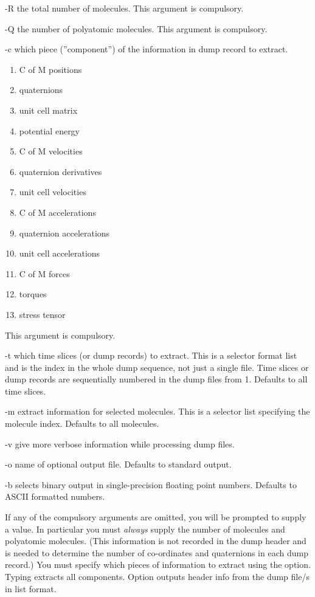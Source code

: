 \documentclass[a4paper,twoside]{report}
\begin{document}
\begin{Argdescription}
\item[-R] the total number of molecules.  This argument is compulsory.
\item[-Q] the number of polyatomic molecules.  This argument is compulsory.
\item[-c] which piece (''component'') of the information in dump
record to extract.  
\begin{enumerate}
\itemsep=0pt
\parskip=0pt
\item C of M positions
\item quaternions
\item unit cell matrix
\item potential energy
\item C of M velocities
\item quaternion derivatives
\item unit cell velocities
\item C of M accelerations
\item quaternion accelerations
\item unit cell accelerations
\item C of M forces
\item torques
\item stress tensor
\end{enumerate}
This argument is compulsory.
\item[-t] which time slices (or dump records) to extract.  This is a
selector format list and is the index in the whole dump sequence, not
just a single file.  Time slices or dump records are sequentially
numbered in the dump files from 1.  Defaults to all time slices.
\item[-m] extract information for selected molecules.  This is a
selector list specifying the molecule index.  Defaults to all
molecules.
\item[-v] give more verbose information while processing dump files.
\item[-o] name of optional output file.  Defaults to standard output.
\item[-b] selects binary output in single-precision floating point
numbers. Defaults to ASCII formatted numbers.
\end{Argdescription}
If any of the compulsory arguments are omitted, you will be prompted
to supply a value.  In particular you must \emph{always} supply the
number of molecules and polyatomic molecules.  (This information is
not recorded in the dump header and is needed to determine the number
of co-ordinates and quaternions in each dump record.)  You must
specify which pieces of information to extract using the 
option. Typing  extracts all components. Option  
outputs header info from the dump file/s in list format.  
\end{document}
